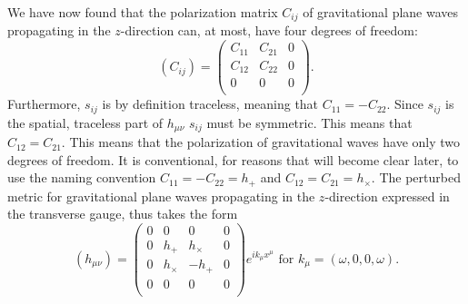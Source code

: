 \documentclass[twoside,utf8]{article}
\begin{document}
We have now found that the polarization matrix $C_{ij}$ of gravitational plane waves propagating in the $z$-direction can, at most, have four degrees of freedom:
\[
(C_{ij})=
\left(\begin{matrix}
  C_{11} &  C_{21} &  0 \\
  C_{12} &  C_{22} &  0 \\
  0      &  0      &  0 \\
\end{matrix}\right).
\]
Furthermore, $s_{ij}$ is by definition traceless, meaning that $C_{11}=-C_{22}$. Since $s_{ij}$ is the spatial, traceless part of $h_{\mu\nu}$ $s_{ij}$ must be symmetric. This means that $C_{12}=C_{21}$. This means that the polarization of gravitational waves have only two degrees of freedom. It is conventional, for reasons that will become clear later, to use the naming convention $C_{11}=-C_{22}=h_{+}$ and $C_{12}=C_{21}=h_{\times}$. The perturbed metric for gravitational plane waves propagating in the $z$-direction expressed in the transverse gauge, thus takes the form
\[
(h_{\mu\nu})
= \left(\begin{matrix}
  0      &  0      &  0      &  0 \\
  0      &  h_+    & h_\times&  0 \\
  0      & h_\times& -h_+    &  0 \\
  0      &  0      &  0      &  0 \\
\end{matrix}\right)e^{ik_\mu x^\mu} \text{ for } k_\mu = (\omega,0,0,\omega).
\]








\end{document}
